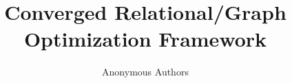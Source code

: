 \documentclass[sigconf]{acmart}
\begin{document}
\title{Converged Relational/Graph Optimization Framework}

\author{Anonymous Authors}





\maketitle



%
%


%
%






\end{document}
